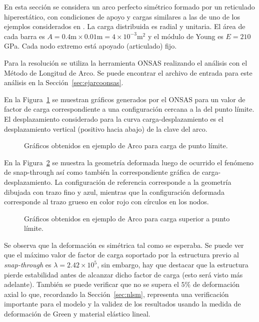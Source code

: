 En esta sección se considera un arco perfecto simétrico formado por un reticulado hiperestático, con condiciones de apoyo y cargas similares a las de uno de los ejemplos considerados en \citep{timoshenko2012theory}. %
%
La carga distribuida es radial y unitaria. %
%
El área de cada barra es $A=0.4 \text{m} \times 0.01 \text{m} = 4\times 10^{-3} \text{m}^2$ y el módulo de Young es $E=210 $ GPa.
%
Cada nodo extremo está apoyado (articulado) fijo. %
%

Para la resolución se utiliza la herramienta ONSAS realizando el análisis con el Método de Longitud de Arco. %
%
Se puede encontrar el archivo de entrada para este análisis en la Sección~\ref{sec:ejarcoonsas}.


En la Figura~\ref{fig:arcocarga1} se muestran gráficos generados por el ONSAS para un valor de factor de carga correspondiente a una configuración cercana a la del punto límite. %
%
El desplazamiento considerado para la curva carga-desplazamiento es el desplazamiento vertical (positivo hacia abajo) de la clave del arco.

\begin{figure}[htb]
	\centering
	\resizebox{.47\linewidth}{!}{}
	\resizebox{.47\linewidth}{!}{}
	\caption{Gráficos obtenidos en ejemplo de Arco para carga de punto límite.}
	\label{fig:arcocarga1}
\end{figure}

En la Figura~\ref{fig:arcocarga2} se muestra la geometría deformada luego de ocurrido el fenómeno de snap-through así como también la correspondiente gráfica de carga-desplazamiento. %
%
La configuración de referencia corresponde a la geometría dibujada con trazo fino y azul, mientras que la configuración deformada corresponde al trazo grueso en color rojo con círculos en los nodos.

\begin{figure}[htb]
	\centering
	\resizebox{.47\linewidth}{!}{}
	\resizebox{.47\linewidth}{!}{}
	\caption{Gráficos obtenidos en ejemplo de Arco para carga superior a punto límite.}
	\label{fig:arcocarga2}
\end{figure}

Se observa que la deformación es simétrica tal como se esperaba. %
%
Se puede ver que el máximo valor de factor de carga soportado por la estructura previo al \textit{snap-through} es $\lambda = 2.42 \times 10^5$, sin embargo, hay que destacar que la estructura pierde estabilidad antes de alcanzar dicho factor de carga (esto será visto más adelante). %
%
También se puede verificar que no se supera el $5 \%$ de deformación axial lo que, recordando la Sección~\ref{sec:nlsm}, representa una verificación importante para el modelo y la validez de los resultados usando la medida de deformación de Green y material elástico lineal.

